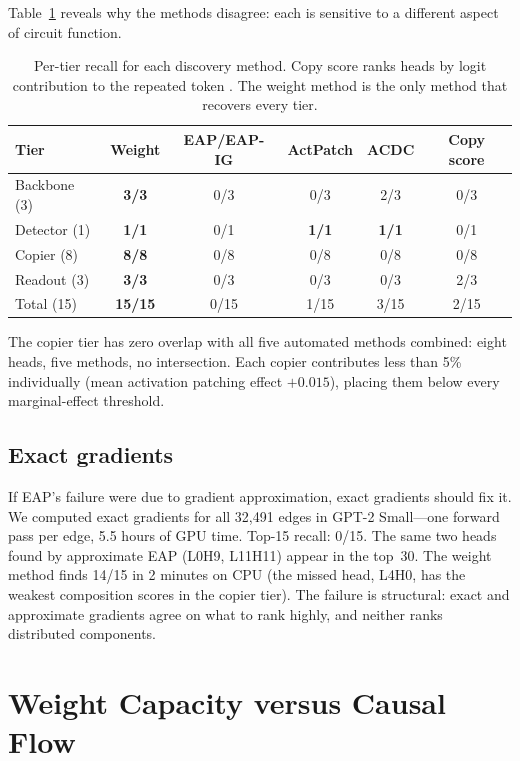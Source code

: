 \documentclass{article}
\newcommand{\NUM}[1]{\textbf{#1}}
\begin{document}
Table~\ref{tab:tier_recovery} reveals why the methods disagree: each is
sensitive to a different aspect of circuit function.

\begin{table}[h]
\centering
\caption{Per-tier recall for each discovery method. Copy score
ranks heads by logit contribution to the repeated token
\citep{wang2023ioi}. The weight method is the only method that
recovers every tier.}
\label{tab:tier_recovery}
\begin{tabular}{lccccc}
\toprule
\textbf{Tier} & \textbf{Weight} & \textbf{EAP/EAP-IG} & \textbf{ActPatch} & \textbf{ACDC} & \textbf{Copy score} \\
\midrule
Backbone (3) & \NUM{3/3} & 0/3 & 0/3 & 2/3 & 0/3 \\
Detector (1) & \NUM{1/1} & 0/1 & \NUM{1/1} & \NUM{1/1} & 0/1 \\
Copier (8)   & \NUM{8/8} & 0/8 & 0/8 & 0/8 & 0/8 \\
Readout (3)  & \NUM{3/3} & 0/3 & 0/3 & 0/3 & 2/3 \\
\midrule
Total (15)   & \NUM{15/15} & 0/15 & 1/15 & 3/15 & 2/15 \\
\bottomrule
\end{tabular}
\end{table}

The copier tier has zero overlap with all five automated methods
combined: eight heads, five methods, no intersection. Each copier
contributes less than 5\% individually (mean activation patching
effect $+0.015$), placing them below every marginal-effect threshold.

\subsection{Exact gradients}

If EAP's failure were due to gradient approximation, exact gradients
should fix it. We computed exact gradients for all 32,491 edges in GPT-2
Small---one forward pass per edge, 5.5 hours of GPU time. Top-15 recall:
0/15. The same two heads found by approximate EAP (L0H9, L11H11) appear
in the top~30. The weight method finds 14/15 in 2 minutes on CPU (the
missed head, L4H0, has the weakest composition scores in the copier
tier). The failure is structural: exact and approximate gradients
agree on what to rank highly, and neither ranks distributed
components.


\section{Weight Capacity versus Causal Flow}
\label{sec:capacity}
\end{document}
